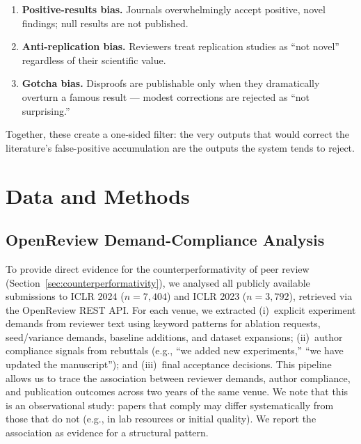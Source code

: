 \documentclass{article}
\begin{document}
\begin{enumerate}[leftmargin=*]
  \item \textbf{Positive-results bias.} Journals overwhelmingly accept positive, novel findings; null results are not published.
  \item \textbf{Anti-replication bias.} Reviewers treat replication studies as ``not novel'' regardless of their scientific value.
  \item \textbf{Gotcha bias.} Disproofs are publishable only when they dramatically overturn a famous result --- modest corrections are rejected as ``not surprising.''
\end{enumerate}

Together, these create a one-sided filter: the very outputs that would correct the literature's false-positive accumulation are the outputs the system tends to reject.


\section{Data and Methods}
\label{sec:methods}

\subsection{OpenReview Demand-Compliance Analysis}

To provide direct evidence for the counterperformativity of peer review (Section~\ref{sec:counterperformativity}), we analysed all publicly available submissions to ICLR 2024 ($n = 7{,}404$) and ICLR 2023 ($n = 3{,}792$), retrieved via the OpenReview REST API. For each venue, we extracted (i)~explicit experiment demands from reviewer text using keyword patterns for ablation requests, seed/variance demands, baseline additions, and dataset expansions; (ii)~author compliance signals from rebuttals (e.g., ``we added new experiments,'' ``we have updated the manuscript''); and (iii)~final acceptance decisions. This pipeline allows us to trace the association between reviewer demands, author compliance, and publication outcomes across two years of the same venue. We note that this is an observational study: papers that comply may differ systematically from those that do not (e.g., in lab resources or initial quality). We report the association as evidence for a structural pattern.
\end{document}
